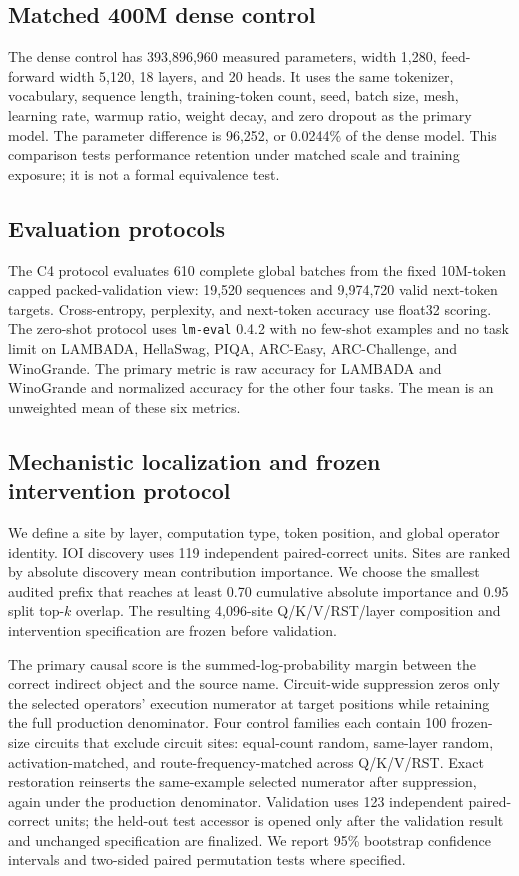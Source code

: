 \documentclass{article}
\begin{document}
\subsection{Matched 400M dense control}

The dense control has 393,896,960 measured parameters, width 1,280, feed-forward
width 5,120, 18 layers, and 20 heads. It uses the same tokenizer, vocabulary,
sequence length, training-token count, seed, batch size, mesh, learning rate,
warmup ratio, weight decay, and zero dropout as the primary model. The
parameter difference is 96,252, or 0.0244\% of the dense model. This comparison
tests performance retention under matched scale and training exposure; it is
not a formal equivalence test.

\subsection{Evaluation protocols}

The C4 protocol evaluates 610 complete global batches from the fixed
10M-token capped packed-validation view: 19,520 sequences and 9,974,720 valid
next-token targets. Cross-entropy, perplexity, and next-token accuracy use
float32 scoring. The zero-shot protocol uses \texttt{lm-eval} 0.4.2 with no
few-shot examples and no task limit on LAMBADA, HellaSwag, PIQA, ARC-Easy,
ARC-Challenge, and WinoGrande. The primary metric is raw accuracy for LAMBADA
and WinoGrande and normalized accuracy for the other four tasks. The mean is
an unweighted mean of these six metrics.

\subsection{Mechanistic localization and frozen intervention protocol}
\label{sec:protocol}

We define a site by layer, computation type, token position, and global operator
identity.
IOI discovery uses 119 independent paired-correct units. Sites are ranked by
absolute discovery mean contribution importance. We choose the smallest
audited prefix that reaches at least 0.70 cumulative absolute importance and
0.95 split top-\(k\) overlap. The resulting 4,096-site Q/K/V/RST/layer
composition and intervention specification are frozen before validation.

The primary causal score is the summed-log-probability margin between the
correct indirect object and the source name. Circuit-wide suppression zeros
only the selected operators' execution numerator at target positions while
retaining the full production denominator. Four control families each contain
100 frozen-size circuits that exclude circuit sites: equal-count random,
same-layer random, activation-matched, and route-frequency-matched across
Q/K/V/RST. Exact
restoration reinserts the same-example selected numerator after suppression,
again under the production denominator. Validation uses 123 independent
paired-correct units; the held-out test accessor is opened only after the
validation result and unchanged specification are finalized. We report 95\%
bootstrap confidence intervals and two-sided paired permutation tests where
specified.
\end{document}
